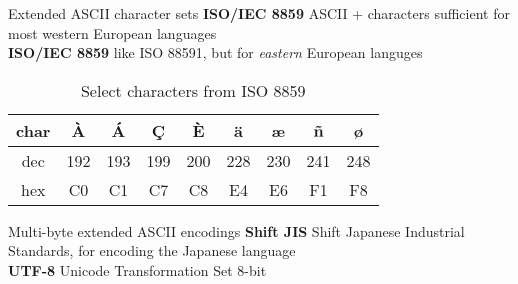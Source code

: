 \documentclass[../index.tex]{subfiles}
\begin{document}
\renewcommand{\currenttitle}{Extended ASCII character sets}
\begin{frame}{\currenttitle}
%
%
%
  \textbf{ISO/IEC 8859} \textendash{}
    ASCII + characters sufficient for most western European languages \\
  \textbf{ISO/IEC 8859} \textendash{}
    like ISO 8859\textendash{}1, but for \textit{eastern} European languges \\

  \vspace*{1em}

  \begin{table}
    \begin{tabular}{|c||c|c|c|c|c|c|c|c|}
      \hline
      char & À  & Á  & Ç  & È  & ä  & æ  & ñ  & ø    \\ \hline
      dec  & 192& 193& 199& 200& 228& 230& 241& 248  \\
      hex  & C0 & C1 & C7 & C8 & E4 & E6 & F1 & F8   \\
      \hline
    \end{tabular}
    \caption{Select characters from ISO 8859}
  \end{table}
\end{frame}

\renewcommand{\currenttitle}{Multi-byte extended ASCII encodings}
\begin{frame}{\currenttitle}
%
%
%
  \textbf{Shift JIS} \textendash{}
    Shift Japanese Industrial Standards, for encoding the Japanese language \\
  \textbf{UTF-8} \textendash{}
    Unicode Transformation Set \textendash{} 8-bit
\end{frame}

\end{document}
